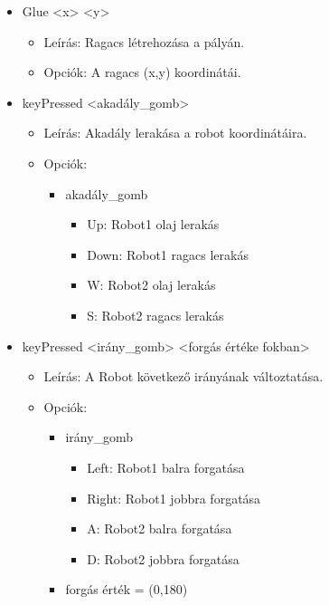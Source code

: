 \begin{itemize}
\item Glue <x> <y>
	\begin{itemize}
	\item Leírás: Ragacs létrehozása a pályán.
	\item Opciók: A ragacs (x,y) koordinátái.
	\end{itemize}
	
\item keyPressed <akadály\_gomb>
	\begin{itemize}
	\item Leírás: Akadály lerakása a robot koordinátáira.
	\item Opciók: 
	\begin{itemize}
    	    \item akadály\_gomb
        	    \begin{itemize}
        	        \item Up: Robot1 olaj lerakás
        	        \item Down: Robot1 ragacs lerakás
        	        \item W: Robot2 olaj lerakás
        	        \item S: Robot2 ragacs lerakás
        	    \end{itemize}
    	\end{itemize}
	\end{itemize}
	
\item keyPressed <irány\_gomb> <forgás értéke fokban>
	\begin{itemize}
	\item Leírás: A Robot következő irányának változtatása.
	\item Opciók: 
    	\begin{itemize}
    	    \item irány\_gomb
        	    \begin{itemize}
        	        \item Left: Robot1 balra forgatása
        	        \item Right: Robot1 jobbra forgatása
        	        \item A: Robot2 balra forgatása
        	        \item D: Robot2 jobbra forgatása
        	    \end{itemize}
        	 \item forgás érték = (0,180)
    	\end{itemize}
	\end{itemize}
	

\end{itemize}
